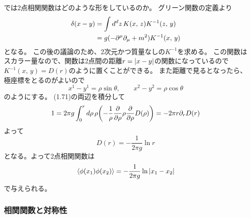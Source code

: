 \documentclass[../../master.tex]{subfiles}
\begin{document}
では2点相関関数はどのような形をしているのか。
グリーン関数の定義より
\begin{align}
    \delta(x-y)
    &= \int d^dz\,K(x,\,z)K^{-1}(z,\,y)\notag\\
    &= g(-\partial^\mu\partial_\mu+m^2)K^{-1}(x,\,y)
\end{align}
となる。
この後の議論のため、2次元かつ質量なしの\(K^{-1}\)を求める。
この関数はスカラー量なので、関数は2点間の距離\(r=\abs{x-y}\)の関数になっているので
\(K^{-1}(x,\,y)=D(r)\)のように置くことができる。
また距離で見るとなったら、極座標をとるのがよいので
\begin{equation}
    x^1-y^1=\rho\sin\theta,\qquad x^2-y^2=\rho\cos\theta
\end{equation}
のようにする。
(1.71)の両辺を積分して
\begin{equation}
    1 = 2\pi g \int_0^r d\rho\,\rho\qty(-\frac{1}{\rho}\pdv{\rho}\rho\pdv{\rho}D(\rho)) = -2\pi r\partial_r D(r)
\end{equation}
よって
\begin{equation}
    D(r) = -\frac{1}{2\pi g}\ln r
\end{equation}
となる。よって2点相関関数は
\begin{equation}
    \ev{\phi(x_1)\phi(x_2)}=-\frac{1}{2\pi g}\ln\abs{x_1-x_2}
\end{equation}
で与えられる。

\subsubsection*{相関関数と対称性}
\end{document}
